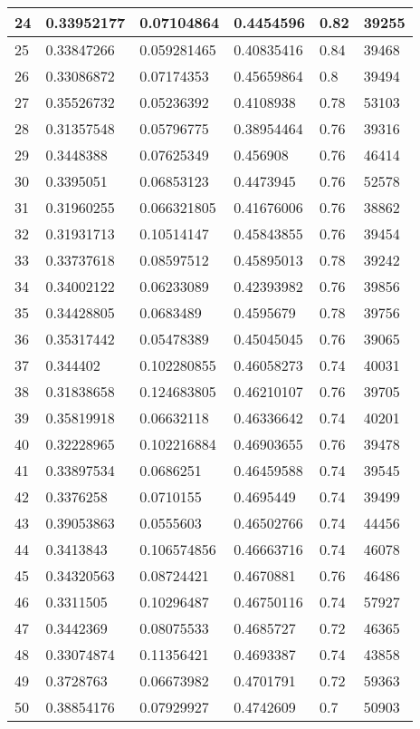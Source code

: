 \begin{longtable}{|l|l|l|l|l|l|}
24 & 0.33952177 & 0.07104864 & 0.4454596 & 0.82 & 39255 \\ \hline 
25 & 0.33847266 & 0.059281465 & 0.40835416 & 0.84 & 39468 \\ \hline 
26 & 0.33086872 & 0.07174353 & 0.45659864 & 0.8 & 39494 \\ \hline 
27 & 0.35526732 & 0.05236392 & 0.4108938 & 0.78 & 53103 \\ \hline 
28 & 0.31357548 & 0.05796775 & 0.38954464 & 0.76 & 39316 \\ \hline 
29 & 0.3448388 & 0.07625349 & 0.456908 & 0.76 & 46414 \\ \hline 
30 & 0.3395051 & 0.06853123 & 0.4473945 & 0.76 & 52578 \\ \hline 
31 & 0.31960255 & 0.066321805 & 0.41676006 & 0.76 & 38862 \\ \hline 
32 & 0.31931713 & 0.10514147 & 0.45843855 & 0.76 & 39454 \\ \hline 
33 & 0.33737618 & 0.08597512 & 0.45895013 & 0.78 & 39242 \\ \hline 
34 & 0.34002122 & 0.06233089 & 0.42393982 & 0.76 & 39856 \\ \hline 
35 & 0.34428805 & 0.0683489 & 0.4595679 & 0.78 & 39756 \\ \hline 
36 & 0.35317442 & 0.05478389 & 0.45045045 & 0.76 & 39065 \\ \hline 
37 & 0.344402 & 0.102280855 & 0.46058273 & 0.74 & 40031 \\ \hline 
38 & 0.31838658 & 0.124683805 & 0.46210107 & 0.76 & 39705 \\ \hline 
39 & 0.35819918 & 0.06632118 & 0.46336642 & 0.74 & 40201 \\ \hline 
40 & 0.32228965 & 0.102216884 & 0.46903655 & 0.76 & 39478 \\ \hline 
41 & 0.33897534 & 0.0686251 & 0.46459588 & 0.74 & 39545 \\ \hline 
42 & 0.3376258 & 0.0710155 & 0.4695449 & 0.74 & 39499 \\ \hline 
43 & 0.39053863 & 0.0555603 & 0.46502766 & 0.74 & 44456 \\ \hline 
44 & 0.3413843 & 0.106574856 & 0.46663716 & 0.74 & 46078 \\ \hline 
45 & 0.34320563 & 0.08724421 & 0.4670881 & 0.76 & 46486 \\ \hline 
46 & 0.3311505 & 0.10296487 & 0.46750116 & 0.74 & 57927 \\ \hline 
47 & 0.3442369 & 0.08075533 & 0.4685727 & 0.72 & 46365 \\ \hline 
48 & 0.33074874 & 0.11356421 & 0.4693387 & 0.74 & 43858 \\ \hline 
49 & 0.3728763 & 0.06673982 & 0.4701791 & 0.72 & 59363 \\ \hline 
50 & 0.38854176 & 0.07929927 & 0.4742609 & 0.7 & 50903 \\ \hline 
\end{longtable}